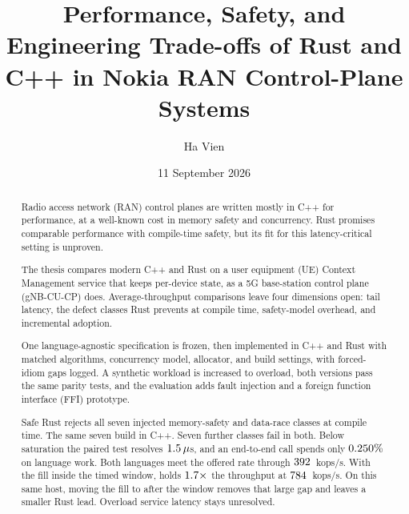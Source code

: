 \documentclass[english,oneside,a4paper,censored,csm,software-track-2020]{HYthesisML}
\title{Performance, Safety, and Engineering Trade-offs of Rust and C++ in Nokia RAN Control-Plane Systems}
\author{Ha Vien}
\date{11 September 2026}
\begin{document}
\maketitle

{\singlespacing
\begin{otherlanguage}{english}
\begin{abstract}
      \setlength{\parskip}{1ex}
      Radio access network (RAN) control planes are written mostly in C++ for performance, at a
      well-known cost in memory safety and concurrency. Rust promises comparable performance with
      compile-time safety, but its fit for this latency-critical setting is unproven.
      
      The thesis compares modern C++ and Rust on a user equipment (UE) Context Management service
      that keeps per-device state, as a 5G base-station control plane (gNB-CU-CP) does.
      Average-throughput comparisons leave four dimensions open: tail latency, the defect classes
      Rust prevents at compile time, safety-model overhead, and incremental adoption.
      
      One language-agnostic specification is frozen, then implemented in C++ and Rust with
      matched algorithms, concurrency model, allocator, and build settings, with forced-idiom
      gaps logged. A synthetic workload is increased to overload, both versions pass the same
      parity tests, and the evaluation adds fault injection and a foreign function interface
      (FFI) prototype.
      
      Safe Rust rejects all seven injected memory-safety and data-race classes at compile time.
      The same seven build in C++. Seven further classes fail in both. Below saturation the
      paired test resolves $1.5\,\mu$s, and an end-to-end call spends only
      $0.250\%$ on language work. Both languages meet the offered rate through
      $392$~kops/s. With the fill inside the timed window, \OverloadSustainedFaster{}
      holds $1.7\times$ the throughput at $784$~kops/s. On this same
      host, moving the fill to after the window removes that large gap and leaves a smaller
      Rust lead. Overload service latency stays unresolved.
      
\end{abstract}
\end{otherlanguage}
}
\end{document}
